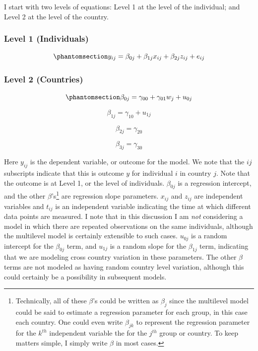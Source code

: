 \documentclass[
  letterpaper,
  DIV=11,
  numbers=noendperiod]{scrreprt}
\begin{document}
I start with two levels of equations: Level 1 at the level of the
individual; and Level 2 at the level of the country.

\subsubsection{Level 1 (Individuals)}\label{level-1-individuals}

\begin{equation}\phantomsection\label{eq-MLM1}{y_{ij} = \beta_{0j} + \beta_{1j} x_{ij} + \beta_{2j} z_{ij} + e_{ij}}\end{equation}

\subsubsection{Level 2 (Countries)}\label{level-2-countries}

\begin{equation}\phantomsection\label{eq-MLM2}{\beta_{0j} = \gamma_{00} +\gamma_{01} w_j + u_{0j}}\end{equation}

\[\beta_{1j} = \gamma_{10} + u_{1j}\]

\[\beta_{2j} = \gamma_{20}\]

\[\beta_{3j} = \gamma_{30}\]

Here \(y_{ij}\) is the dependent variable, or outcome for the model. We
note that the \(ij\) subscripts indicate that this is outcome \(y\) for
individual \(i\) in country \(j\). Note that the outcome is at Level 1,
or the level of individuals. \(\beta_{0j}\) is a regression intercept,
and the other \(\beta\)'s\footnote{Technically, all of these \(\beta\)'s
  could be written as \(\beta_j\) since the multilevel model could be
  said to estimate a regression parameter for each group, in this case
  each country. One could even write \(\beta_{jk}\) to represent the
  regression parameter for the \(k^{th}\) independent variable the for
  the \(j^{th}\) group or country. To keep matters simple, I simply
  write \(\beta\) in most cases.} are regression slope parameters.
\(x_{ij}\) and \(z_{ij}\) are independent variables and \(t_{ij}\) is an
independent variable indicating the time at which different data points
are measured. I note that in this discussion I am \emph{not} considering
a model in which there are repeated observations on the same
individuals, although the multilevel model is certainly extensible to
such cases. \(u_{0j}\) is a random intercept for the \(\beta_{0j}\)
term, and \(u_{1j}\) is a random slope for the \(\beta_{1j}\) term,
indicating that we are modeling cross country variation in these
parameters. The other \(\beta\) terms are not modeled as having random
country level variation, although this could certainly be a possibility
in subsequent models.
\end{document}
